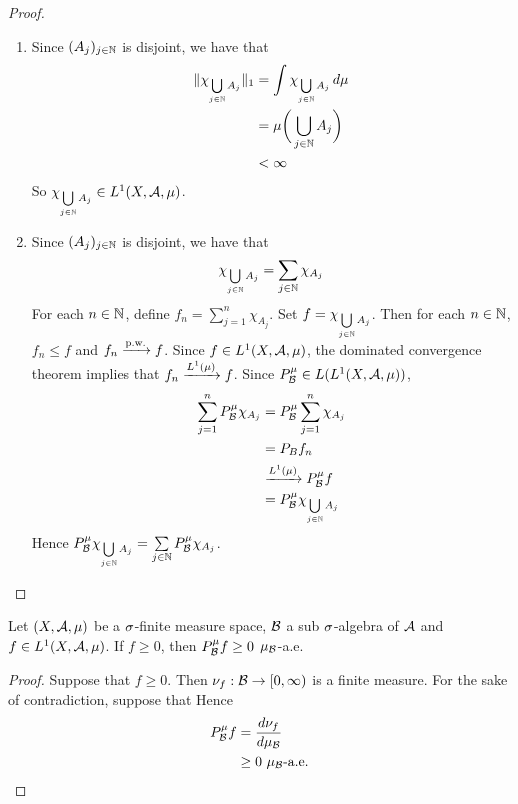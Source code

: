 \documentclass{book}
\begin{document}
	\begin{proof}\
		\begin{enumerate}
			\item Since $(A_j)_{j \in \mathbb{N}}$ is disjoint, we have that 
			\begin{align*}
				\|\chi_{\bigcup\limits_{j \in \mathbb{N}} A_j}\|_1 
				& = \int \chi_{\bigcup\limits_{j \in \mathbb{N}} A_j} \, d \mu \\
				& = \mu\bigg(\bigcup\limits_{j \in \mathbb{N}} A_j \bigg) \\
				& < \infty
			\end{align*}
			So $\chi_{\bigcup\limits_{j \in \mathbb{N}} A_j} \in L^1(X, \mathcal{A}, \mu)$.
			\item Since  $(A_j)_{j \in \mathbb{N}}$ is disjoint, we have that 
			$$\chi_{\bigcup\limits_{j \in \mathbb{N}} A_j} = \sum\limits_{j \in \mathbb{N}} \chi_{A_j}$$
			For each $n \in \mathbb{N}$, define $f_n = \sum\limits_{j = 1}^n \chi_{A_j}$. Set $f = \chi_{\bigcup\limits_{j \in \mathbb{N}} A_j}$. Then for each $n \in \mathbb{N}$, $f_n \leq f$ and $f_n \xrightarrow{\text{p.w.}} f$. Since $f \in L^1(X, \mathcal{A}, \mu)$, the dominated convergence theorem implies that $f_n \xrightarrow{L^1(\mu)} f$. Since $P^{\mu}_{\mathcal{B}} \in L(L^1(X, \mathcal{A}, \mu))$, 
			\begin{align*}
				\sum_{j=1}^n P^{\mu}_{\mathcal{B}} \chi_{A_j}
				& = P^{\mu}_{\mathcal{B}} \sum_{j=1}^n \chi_{A_j} \\
				& = P_{B}f_n \\
				& \xrightarrow{L^1(\mu)} P^{\mu}_{\mathcal{B}}f \\
				& = P^{\mu}_{\mathcal{B}} \chi_{\bigcup\limits_{j \in \mathbb{N}} A_j} 
			\end{align*}  
			Hence  $P^{\mu}_{\mathcal{B}} \chi_{\bigcup\limits_{j \in \mathbb{N}} A_j} = \sum\limits_{j \in \mathbb{N}} P^{\mu}_{\mathcal{B}}\chi_{A_j}$.
		\end{enumerate}
	\end{proof}

	\begin{ex}
		Let $(X, \mathcal{A}, \mu)$ be a $\sigma$-finite measure space, $\mathcal{B}$ a sub $\sigma$-algebra of $\mathcal{A}$ and $f \in L^1(X, \mathcal{A}, \mu)$. If $f \geq 0$, then $P^{\mu}_{\mathcal{B}}f \geq 0$ $\mu_{\mathcal{B}}$-a.e.
	\end{ex}

	\begin{proof}
		Suppose that $f \geq 0$. Then $\nu_f: \mathcal{B} \rightarrow [0, \infty)$ is a finite measure. For the sake of contradiction, suppose that Hence 
		\begin{align*}
			P^{\mu}_{\mathcal{B}}f 
			& = \frac{d \nu_f}{d \mu_{\mathcal{B}}} \\
			& \geq 0 \text{ $\mu_{\mathcal{B}}$-a.e.}
		\end{align*}
	\end{proof}
\end{document}
